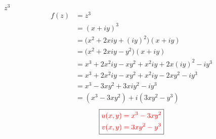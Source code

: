 \item[1.] $z^3$
\begin{align*}
    f(z) 
    &= z^3 \\
    &= (x+iy)^3 \\
    &= \Big(x^2+2xiy+(iy)^2\Big)(x+iy)\\
    &= \Big(x^2+2xiy-y^2\Big)(x+iy)\\
    &= x^3+2x^2iy-xy^2 + x^2iy+2x(iy)^2-iy^3\\
    &= x^3+2x^2iy-xy^2 + x^2iy-2xy^2-iy^3\\
    &= x^3-3xy^2+3xiy^2-iy^3\\
    &= (x^3-3xy^2) + i(3xy^2-y^3)
\end{align*}
\[
\boxed{
\textcolor{red}{
\begin{aligned}
u(x,y) &= x^3 - 3xy^2 \\
v(x,y) &= 3xy^2 - y^3
\end{aligned}
}
}
\]
